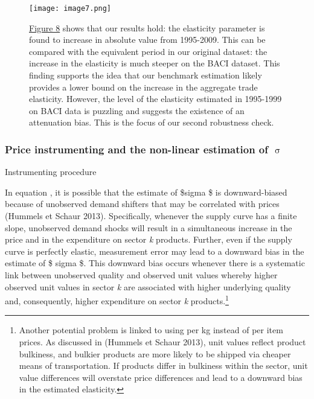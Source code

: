 \documentclass[12pt,twoside,a4paper,notitlepage]{article}
\begin{document}
{\begin{figure}
\caption{{\hyperref[ref-008]{Figure 8}} shows that our results hold: the elasticity parameter is found to increase in absolute value from 1995-2009. This can be compared with the equivalent period in our original dataset: the increase in the elasticity is much steeper on the BACI dataset. This finding supports the idea that our benchmark estimation likely provides a lower bound on the increase in the aggregate trade elasticity. However, the level of the elasticity estimated in 1995-1999 on BACI data is puzzling and suggests the existence of an attenuation bias. This is the focus of our second robustness check. }
\texttt{[image: image7.png]}
\label{fig:1}
\end{figure}

\subsubsection{Price instrumenting%
 and the non-linear estimation of ${\upsigma}$\label{mark-2.3.2.}}

Instrumenting procedure

In equation {\hyperref[ref-002]{ }}, it is possible that the estimate of \$sigma \$ is downward-biased because of unobserved demand shifters that may be correlated with prices (Hummels et Schaur 2013). Specifically, whenever the supply curve has a finite slope, unobserved demand shocks will result in a simultaneous increase in the price and in the expenditure on sector \textit{k} products. Further, even if the supply curve is perfectly elastic, measurement error may lead to a downward bias in the estimate of \$ sigma \$. This downward bias occurs whenever there is a systematic link between unobserved quality and observed unit values whereby higher observed unit values in sector \textit{k} are associated with higher underlying quality and, consequently, higher expenditure on sector \textit{k} products.\footnote{Another potential problem is linked to using per kg instead of per item prices. As discussed in (Hummels et Schaur 2013), unit values reflect product bulkiness, and bulkier products are more likely to be shipped via cheaper means of transportation. If products differ in bulkiness within the sector, unit value differences will overstate price differences and lead to a downward bias in the estimated elasticity.
} 

}
\end{document}

